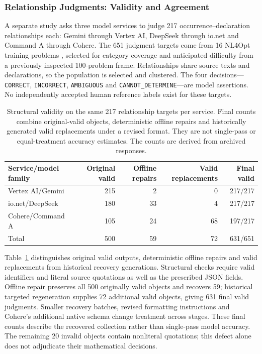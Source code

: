 \subsubsection{Relationship Judgments: Validity and Agreement}
\label{subsec:relationship-audit}
A separate study asks three model services to judge 217 occurrence--declaration relationships each: Gemini through Vertex AI, DeepSeek through io.net and Command A through Cohere. The 651 judgment targets come from 16 NL4Opt training problems \cite{ramamonjison2023nl4opt}, selected for category coverage and anticipated difficulty from a previously inspected 100-problem frame. Relationships share source texts and declarations, so the population is selected and clustered. The four decisions---\texttt{CORRECT}, \texttt{INCORRECT}, \texttt{AMBIGUOUS} and \texttt{CANNOT\_DETERMINE}---are model assertions. No independently accepted human reference labels exist for these targets.

\begin{table}[htbp]\centering\small
\caption{Structural validity on the same 217 relationship targets per service. Final counts combine original-valid objects, deterministic offline repairs and historically generated valid replacements under a revised format. They are not single-pass or equal-treatment accuracy estimates. The counts are derived from archived responses.}\label{tab:relationship-validity}
\setlength{\tabcolsep}{3.5pt}
\begin{tabular}{@{}lrrrr@{}}\toprule
Service/model family & Original valid & Offline repairs & Valid replacements & Final valid\\\midrule
Vertex AI/Gemini & 215 & 2 & 0 & 217/217\\
io.net/DeepSeek & 180 & 33 & 4 & 217/217\\
Cohere/Command A & 105 & 24 & 68 & 197/217\\\midrule
Total & 500 & 59 & 72 & 631/651\\\bottomrule
\end{tabular}\end{table}

Table~\ref{tab:relationship-validity} distinguishes original valid outputs, deterministic offline repairs and valid replacements from historical recovery generations. Structural checks require valid identifiers and literal source quotations as well as the prescribed JSON fields. Offline repair preserves all 500 originally valid objects and recovers 59; historical targeted regeneration supplies 72 additional valid objects, giving 631 final valid judgments. Smaller recovery batches, revised formatting instructions and Cohere's additional native schema change treatment across stages. These final counts describe the recovered collection rather than single-pass model accuracy. The remaining 20 invalid objects contain nonliteral quotations; this defect alone does not adjudicate their mathematical decisions.


